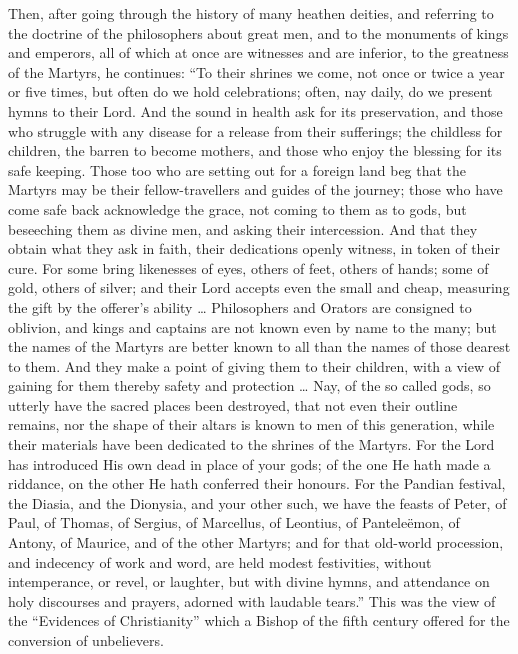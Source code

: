 Then, after going through the history of many heathen
deities, and referring to the doctrine of the
philosophers about great men, and to the monuments of
kings and emperors, all of which at once are witnesses
and are inferior, to the greatness of the Martyrs, he
continues: ``To their shrines we come, not once or
twice a year or five times, but often do we hold
celebrations; often, nay daily, do we present hymns to
their Lord. And the sound in health ask for its
preservation, and those who struggle with any disease for
a release from their sufferings; the childless for
children, the barren to become mothers, and those who
enjoy the blessing for its safe keeping. Those too who
are setting out for a foreign land beg that the Martyrs
may be their fellow-travellers and guides of the journey;
those who have come safe back acknowledge the grace, not
coming to them as to gods, but beseeching them as divine
men, and asking their intercession. And that they obtain
what they ask in faith, their dedications openly witness,
in token of their cure. For some bring likenesses of
eyes, others of feet, others of hands; some of gold,
others of silver; and their Lord accepts even the small
and cheap, measuring the gift by the offerer's ability
… Philosophers and Orators are consigned to
oblivion, and kings and captains are not known even by
name to the many; but the names of the Martyrs are better
known to all than the names of those dearest to them. And
they make a point of giving them to their children, with
a view of gaining for them thereby safety and protection
… Nay, of the so called gods, so utterly have the
sacred places been destroyed, that not even their outline
remains, nor the shape of their altars is known to men of
this generation, while their materials have been
dedicated to the shrines of the Martyrs. For the Lord has
introduced His own dead in place of your gods; of
the one He hath made a riddance, on the other He hath
conferred their honours. For the Pandian festival, the
Diasia, and the Dionysia, and your other such, we have
the feasts of Peter, of Paul, of Thomas, of Sergius, of
Marcellus, of Leontius, of Panteleëmon, of Antony, of
Maurice, and of the other Martyrs; and for that old-world
procession, and indecency of work and word, are held
modest festivities, without intemperance, or revel, or
laughter, but with divine hymns, and attendance on holy
discourses and prayers, adorned with laudable
tears.'' This was the view of the ``Evidences of
Christianity'' which a Bishop of the fifth century
offered for the conversion of unbelievers.

